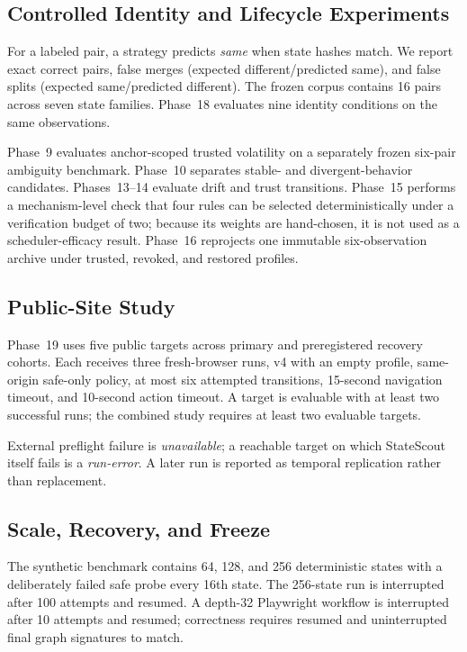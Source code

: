 \documentclass[conference]{IEEEtran}
\begin{document}
\subsection{Controlled Identity and Lifecycle Experiments}
For a labeled pair, a strategy predicts \emph{same} when state hashes match. We report exact correct pairs, false merges (expected different/predicted same), and false splits (expected same/predicted different). The frozen corpus contains 16 pairs across seven state families. Phase~18 evaluates nine identity conditions on the same observations.

Phase~9 evaluates anchor-scoped trusted volatility on a separately frozen six-pair ambiguity benchmark. Phase~10 separates stable- and divergent-behavior candidates. Phases~13--14 evaluate drift and trust transitions. Phase~15 performs a mechanism-level check that four rules can be selected deterministically under a verification budget of two; because its weights are hand-chosen, it is not used as a scheduler-efficacy result. Phase~16 reprojects one immutable six-observation archive under trusted, revoked, and restored profiles.

\subsection{Public-Site Study}
Phase~19 uses five public targets across primary and preregistered recovery cohorts. Each receives three fresh-browser runs, v4 with an empty profile, same-origin safe-only policy, at most six attempted transitions, 15-second navigation timeout, and 10-second action timeout. A target is evaluable with at least two successful runs; the combined study requires at least two evaluable targets.

External preflight failure is \emph{unavailable}; a reachable target on which StateScout itself fails is a \emph{run-error}. A later run is reported as temporal replication rather than replacement.

\subsection{Scale, Recovery, and Freeze}
The synthetic benchmark contains 64, 128, and 256 deterministic states with a deliberately failed safe probe every 16th state. The 256-state run is interrupted after 100 attempts and resumed. A depth-32 Playwright workflow is interrupted after 10 attempts and resumed; correctness requires resumed and uninterrupted final graph signatures to match.
\end{document}
